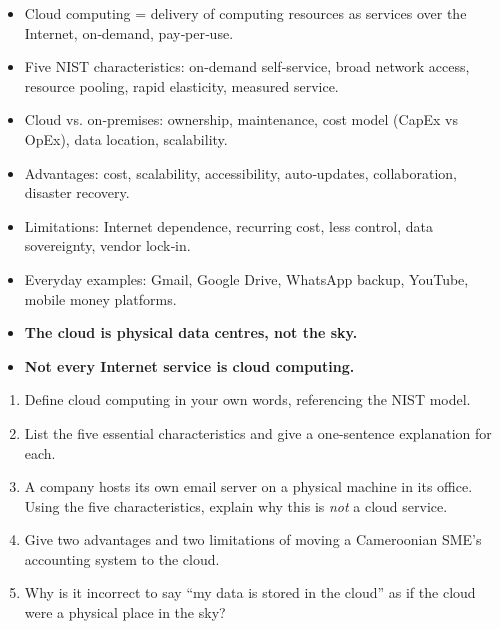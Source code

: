 \documentclass[11pt]{article}
\newcounter{popsec}
\newcounter{popsub}
\newcommand{\courssub}[1]{%
  \stepcounter{popsub}%
  \par\vspace{9pt}\noindent{\popxbold\fontsize{11.5}{13}\selectfont\color{popink}{\color{poporange}\thepopsec.\thepopsub}\hspace{6pt}#1}\par\nopagebreak\vspace{4pt}
}
\begin{document}
\courssub{Summary}
\begin{aretenir}
\begin{itemize}
\item Cloud computing = delivery of computing resources as services over the Internet, on‑demand, pay‑per‑use.
\item Five NIST characteristics: on‑demand self‑service, broad network access, resource pooling, rapid elasticity, measured service.
\item Cloud vs. on‑premises: ownership, maintenance, cost model (CapEx vs OpEx), data location, scalability.
\item Advantages: cost, scalability, accessibility, auto‑updates, collaboration, disaster recovery.
\item Limitations: Internet dependence, recurring cost, less control, data sovereignty, vendor lock‑in.
\item Everyday examples: Gmail, Google Drive, WhatsApp backup, YouTube, mobile money platforms.
\item \textbf{The cloud is physical data centres, not the sky.}
\item \textbf{Not every Internet service is cloud computing.}
\end{itemize}
\end{aretenir}

\begin{exercice}
\begin{enumerate}
\item Define cloud computing in your own words, referencing the NIST model.
\item List the five essential characteristics and give a one‑sentence explanation for each.
\item A company hosts its own email server on a physical machine in its office. Using the five characteristics, explain why this is \emph{not} a cloud service.
\item Give two advantages and two limitations of moving a Cameroonian SME’s accounting system to the cloud.
\item Why is it incorrect to say “my data is stored in the cloud” as if the cloud were a physical place in the sky?
\end{enumerate}
\end{exercice}
\end{document}
